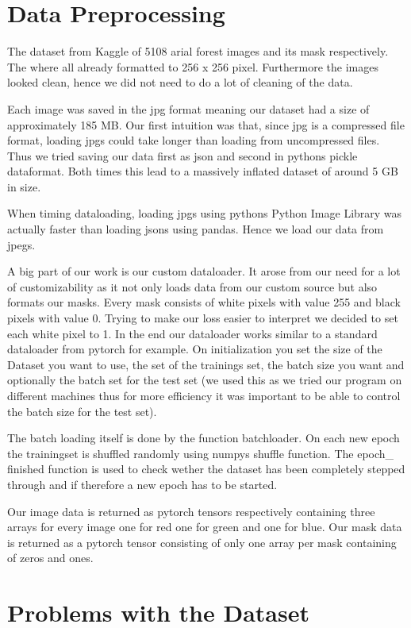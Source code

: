 \section{Data Preprocessing}
The dataset from Kaggle of 5108 arial forest images and its mask
respectively. The where all already formatted to 256 x 256 pixel.
Furthermore the images looked clean, hence we did not need to do
a lot of cleaning of the data.

Each image was saved in the jpg format meaning our
dataset had a size of approximately 185 MB.
Our first intuition was that, since jpg is a
compressed file format, loading jpgs could take longer
than loading from uncompressed files. Thus we tried saving our
data first as json and second in pythons pickle dataformat.
Both times this lead to a massively inflated dataset of
around 5 GB in size.

When timing dataloading, loading jpgs using pythons
Python Image Library was actually faster than loading jsons
using pandas. Hence we load our data from jpegs.

A big part of our work is our custom dataloader.
It arose from our need for a lot of customizability as it not
only loads data from our custom source but also formats our masks.
 Every mask consists of white pixels with value 255 and black
 pixels with value 0. Trying to make our loss easier to interpret
 we decided to set each white pixel to 1.
In the end our dataloader works similar to a standard dataloader
from pytorch for example.
On initialization you set the size of the Dataset you want to
use, the set of the trainings set, the batch size you want and
optionally the batch set for the test set
(we used this as we tried our program on different machines thus for
more efficiency it was important to be able to control the batch size
for the test set).

The batch loading itself is done by the function batchloader.
On each new epoch the trainingset is shuffled randomly using numpys
shuffle function. The epoch\_ finished function is used to check wether
 the dataset has been completely stepped through and if therefore a new
 epoch has to be started.

Our image data is returned as pytorch tensors respectively containing three arrays for every image one for red one for green and one for blue. Our mask data is returned as a pytorch tensor consisting of only one array per mask containing of zeros and ones.

\section{Problems with the Dataset}


